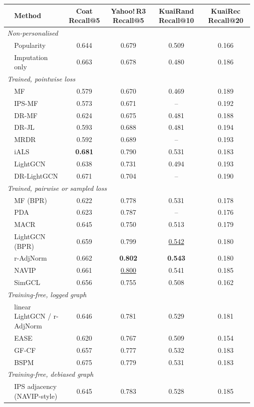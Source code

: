 \begin{tabular}{llcccc}
\toprule
 & Method & Coat Recall@5 & Yahoo!\,R3 Recall@5 & KuaiRand Recall@10 & KuaiRec Recall@20\\
\midrule
\multicolumn{6}{l}{\emph{Non-personalised}}\\
 & Popularity & 0.644 & 0.679 & 0.509 & 0.166\\
 & Imputation only & 0.663 & 0.678 & 0.480 & 0.186\\
\multicolumn{6}{l}{\emph{Trained, pointwise loss}}\\
 & MF & 0.579 & 0.670 & 0.469 & 0.189\\
 & IPS-MF & 0.573 & 0.671 & -- & 0.192\\
 & DR-MF & 0.624 & 0.675 & 0.481 & 0.188\\
 & DR-JL & 0.593 & 0.688 & 0.481 & 0.194\\
 & MRDR & 0.592 & 0.689 & -- & 0.193\\
 & iALS & \textbf{0.681} & 0.790 & 0.531 & 0.183\\
 & LightGCN & 0.638 & 0.731 & 0.494 & 0.193\\
 & DR-LightGCN & 0.671 & 0.704 & -- & 0.190\\
\multicolumn{6}{l}{\emph{Trained, pairwise or sampled loss}}\\
 & MF (BPR) & 0.622 & 0.778 & 0.531 & 0.178\\
 & PDA & 0.623 & 0.787 & -- & 0.176\\
 & MACR & 0.645 & 0.750 & 0.513 & 0.179\\
 & LightGCN (BPR) & 0.659 & 0.799 & \underline{0.542} & 0.180\\
 & r-AdjNorm & 0.662 & \textbf{0.802} & \textbf{0.543} & 0.180\\
 & NAVIP & 0.661 & \underline{0.800} & 0.541 & 0.185\\
 & SimGCL & 0.656 & 0.755 & 0.508 & 0.162\\
\multicolumn{6}{l}{\emph{Training-free, logged graph}}\\
 & linear LightGCN / r-AdjNorm & 0.646 & 0.781 & 0.529 & 0.181\\
 & EASE & 0.620 & 0.767 & 0.509 & 0.154\\
 & GF-CF & 0.657 & 0.777 & 0.532 & 0.183\\
 & BSPM & 0.675 & 0.779 & 0.531 & 0.183\\
\multicolumn{6}{l}{\emph{Training-free, debiased graph}}\\
 & IPS adjacency (NAVIP-style) & 0.645 & 0.783 & 0.528 & 0.185\\

\end{tabular}
